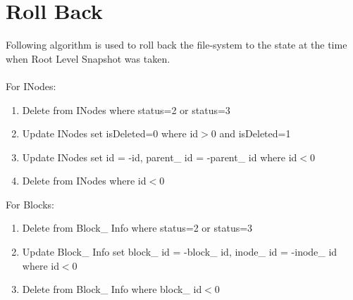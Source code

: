 \section{Roll Back}
 Following algorithm is used to roll back the file-system to the state at the time when Root Level Snapshot was taken.\\\\
For INodes:
\begin{enumerate}
\item Delete from INodes where status=2 or status=3
\item Update INodes set isDeleted=0 where id$>$0 and isDeleted=1
\item Update INodes set id = -id, parent\_ id = -parent\_ id where id$<$0
\item Delete from INodes where id$<$0
\end{enumerate}
For Blocks:
\begin{enumerate}
\item Delete from Block\_ Info where status=2 or status=3
\item Update Block\_ Info set block\_ id = -block\_ id, inode\_ id = -inode\_ id where id$<$0
\item Delete from Block\_ Info where block\_ id$<$0
\end{enumerate}
\label{alg:ROSSRB}





